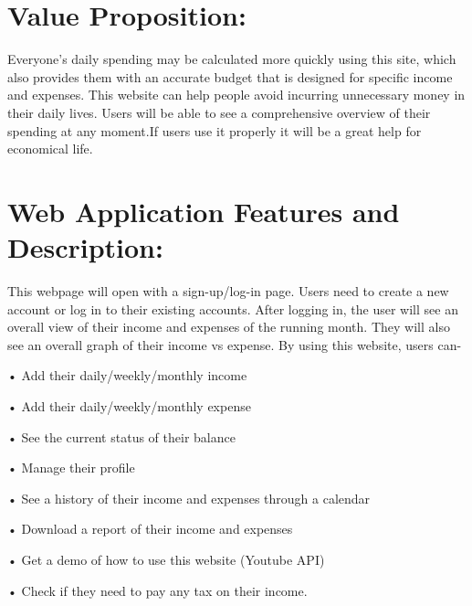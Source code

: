 \documentclass[12pt]{article}
\begin{document}
\clearpage

\section*{Value Proposition:}
\par

Everyone's daily spending may be calculated more quickly using this site, which also provides them with an accurate budget that is designed for specific income and expenses. This website can help people avoid incurring unnecessary money in their daily lives. Users will be able to see a comprehensive overview of their spending at any moment.If users use it properly it will be a great help for economical life.
\vspace{1cm}
\section*{Web Application Features and Description:}
\par
This webpage will open with a sign-up/log-in page. Users need to create a new account or log in to their existing accounts. After logging in, the user will see an overall view of their income and expenses of the running month. They will also see an overall graph of their income vs expense. By using this website, users can-
\par
\vspace{0.5cm}
•	Add their daily/weekly/monthly income
\par
\vspace{0.5cm}
•	Add their daily/weekly/monthly expense
\par
\vspace{0.5cm}
•	See the current status of their balance
\par
\vspace{0.5cm}
•	Manage their profile
\par
\vspace{0.5cm}
•	See a history of their income and expenses through a calendar 
\par
\vspace{0.5cm}
•	Download a report of their income and expenses 
\par
\vspace{0.5cm}
•	Get a demo of how to use this website (Youtube API)
\par
\vspace{0.5cm}
•	Check if they need to pay any tax on their income. 


\clearpage
\end{document}
